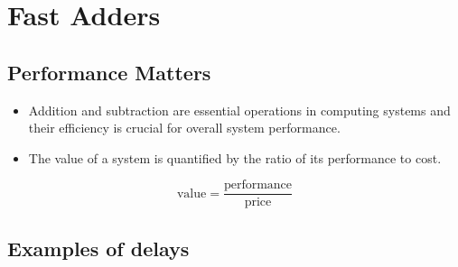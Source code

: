 \documentclass[12pt,openany, tikz,border=10pt]{book}
\begin{document}
			      	\section{Fast Adders}
			      	\subsection{Performance Matters}
			      	\begin{itemize}
			      		\item[] Addition and subtraction are essential operations in computing systems and their efficiency is crucial for overall system performance.
			      		\item[] The value of a system is quantified by the ratio of its performance to cost.
			      	\end{itemize}
			      	\[
			      		\text{value} = \frac{\text{performance}}{\text{price}}
			      	\]
			      	\subsection{Examples of delays}
			      	
\end{document}
